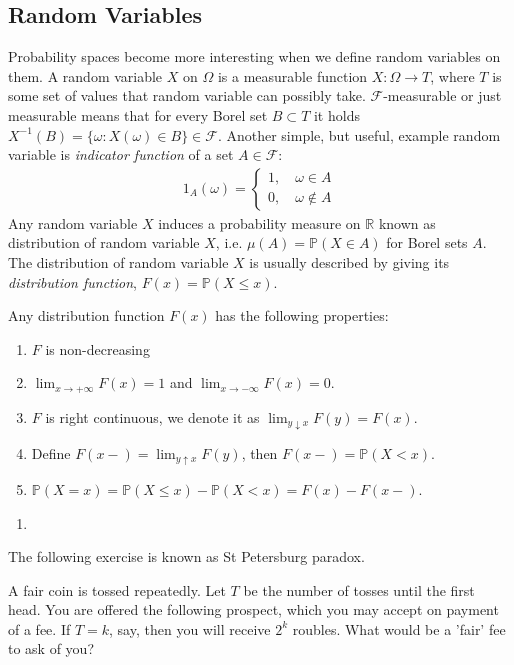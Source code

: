 \subsection{Random Variables} 
Probability spaces become more interesting when we define random variables on them. A random variable $X$ on $\Omega$ is a measurable function $X : \Omega \to T$, where $T$ is some set of values that random variable can possibly take. $\mathcal{F}$-measurable or just measurable means that for every Borel set $B \subset T$ it holds $X^{-1}(B) = \{ \omega: X(\omega) \in B\} \in \mathcal{F}$. Another simple, but useful, example random variable is {\it{indicator function}} of a set $A \in \mathcal{F}$:
\begin{align}
1_A(\omega) = \begin{cases} 1, \quad \omega \in A \\ 0, \quad \omega \notin A \end{cases}
\end{align}
Any random variable $X$ induces a probability measure on $\mathbb{R}$ known as distribution of random variable $X$, i.e. $\mu(A) = \mathbb{P}(X \in A)$ for Borel sets $A$. The distribution of random variable $X$ is usually described by giving its {\it{distribution function}}, $F(x) = \mathbb{P}(X \le x)$. 
\begin{thm}
Any distribution function $F(x)$ has the following properties:
\begin{enumerate}
    \item $F$ is non-decreasing
    \item $\lim_{x \to +\infty} F(x) = 1$ and $\lim_{x \to -\infty} F(x) = 0$. 
    \item $F$ is right continuous, we denote it as $\lim_{y \downarrow x} F(y) = F(x)$. 
    \item Define $F(x-) = \lim_{y \uparrow x}F(y)$, then $F(x-) = \mathbb{P}(X < x)$.
    \item $\mathbb{P}(X = x) = \mathbb{P}(X \le x) - \mathbb{P}(X < x) = F(x) - F(x-)$.
\end{enumerate}
\end{thm}
\begin{s}
\begin{enumerate}
    \item 
\end{enumerate}
\end{s}
\par The following exercise is known as St Petersburg paradox. 
\begin{exer}
A fair coin is tossed repeatedly. Let $T$ be the number of tosses until the first head. You are offered the following prospect, which you may accept on payment of a fee. If $T = k$, say, then you will receive $2^k$ roubles. What would be a 'fair' fee to ask of you? \end{exer}
